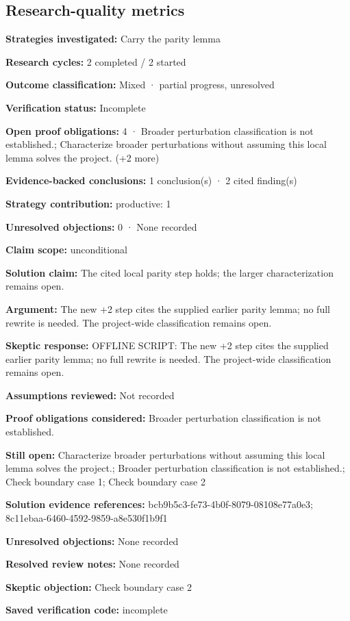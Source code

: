\documentclass[11pt]{article}
\begin{document}
\subsection{Research-quality metrics}
\textbf{Strategies investigated:} Carry the parity lemma\par
\textbf{Research cycles:} 2 completed / 2 started\par
\textbf{Outcome classification:} Mixed · partial progress, unresolved\par
\textbf{Verification status:} Incomplete\par
\textbf{Open proof obligations:} 4 · Broader perturbation classification is not established.; Characterize broader perturbations without assuming this local lemma solves the project. (+2 more)\par
\textbf{Evidence-backed conclusions:} 1 conclusion(s) · 2 cited finding(s)\par
\textbf{Strategy contribution:} productive: 1\par
\textbf{Unresolved objections:} 0 · None recorded\par
\textbf{Claim scope:} unconditional\par
\textbf{Solution claim:} The cited local parity step holds; the larger characterization remains open.\par
\textbf{Argument:} The new +2 step cites the supplied earlier parity lemma; no full rewrite is needed. The project-wide classification remains open.\par
\textbf{Skeptic response:} OFFLINE SCRIPT: The new +2 step cites the supplied earlier parity lemma; no full rewrite is needed. The project-wide classification remains open.\par
\textbf{Assumptions reviewed:} Not recorded\par
\textbf{Proof obligations considered:} Broader perturbation classification is not established.\par
\textbf{Still open:} Characterize broader perturbations without assuming this local lemma solves the project.; Broader perturbation classification is not established.; Check boundary case 1; Check boundary case 2\par
\textbf{Solution evidence references:} bcb9b5c3-fe73-4b0f-8079-08108e77a0e3; 8c11ebaa-6460-4592-9859-a8e530f1b9f1\par
\textbf{Unresolved objections:} None recorded\par
\textbf{Resolved review notes:} None recorded\par
\textbf{Skeptic objection:} Check boundary case 2\par
\textbf{Saved verification code:} incomplete\par
\end{document}
